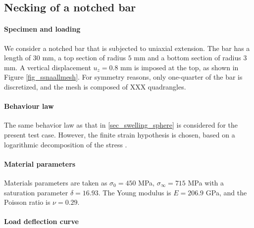 \subsection{Necking of a notched bar}

\paragraph{Specimen and loading}

We consider a notched bar that is subjected to uniaxial
extension.
The bar has a length of $30$ mm, a top section of radius $5$ mm and a bottom section of radius $3$ mm.
A vertical
displacement $u_z = 0.8$ mm is imposed at the top, as shown in Figure \ref{fig_ssnaallmesh}.
For symmetry reasons, only one-quarter of the
bar is discretized, and the mesh is composed of XXX quadrangles.

\paragraph{Behaviour law}

The same behavior law as that in \ref{sec_swelling_sphere} is considered for the present test case. 
However, the finite strain hypothesis is chosen, based on a logarithmic decomposition of the stress \cite{miehe_anisotropic_2002}.

\paragraph{Material parameters}

Materials parameters are taken as
$\sigma_0 = 450$ MPa, $\sigma_{\infty} = 715$ MPa with a saturation parameter $\delta = 16.93$. The Young modulus is $E = 206.9$ GPa, and the Poisson ratio is $\nu = 0.29$.

\paragraph{Load deflection curve}

